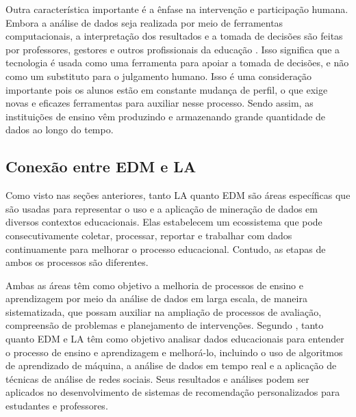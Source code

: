 {Outra característica importante é a ênfase na intervenção e participação humana. Embora a análise de dados seja realizada por meio de ferramentas computacionais, a interpretação dos resultados e a tomada de decisões são feitas por professores, gestores e outros profissionais da educação \cite{Barone_2020}. Isso significa que a tecnologia é usada como uma ferramenta para apoiar a tomada de decisões, e não como um substituto para o julgamento humano. Isso é uma consideração importante pois os alunos estão em constante mudança de perfil, o que exige novas e eficazes ferramentas para auxiliar nesse processo. Sendo assim, as instituições de ensino vêm produzindo e armazenando grande quantidade de dados ao longo do tempo.}



\subsection{Conexão entre EDM e LA}

Como visto nas seções anteriores, tanto LA quanto EDM são áreas específicas que são usadas para representar o uso e a aplicação de mineração de dados em diversos contextos educacionais. Elas estabelecem um ecossistema que pode consecutivamente coletar, processar, reportar e trabalhar com dados continuamente para melhorar o processo educacional. Contudo, as etapas de ambos os processos são diferentes.

{Ambas as áreas têm como objetivo a melhoria de processos de ensino e aprendizagem por meio da análise de dados em larga escala, de maneira sistematizada, que possam auxiliar na ampliação de processos de avaliação, compreensão de problemas e planejamento de intervenções. Segundo , tanto quanto EDM e LA têm como objetivo analisar dados educacionais para entender o processo de ensino e aprendizagem e melhorá-lo, incluindo o uso de algoritmos de aprendizado de máquina, a análise de dados em tempo real e a aplicação de técnicas de análise de redes sociais. Seus resultados e análises podem ser aplicados no desenvolvimento de sistemas de recomendação personalizados para estudantes e professores.}

